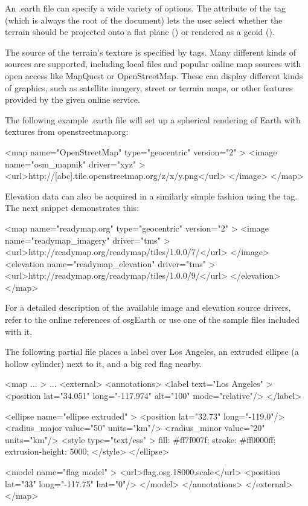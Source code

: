 An .earth file can specify a wide variety of options. The  attribute
of the  tag (which is always the root of the document) lets the user
select whether the terrain should be projected onto a flat plane
() or rendered as a geoid ().

The source of the terrain's texture is specified by  tags. Many
different kinds of sources are supported, including local files and popular
online map sources with open access like MapQuest or OpenStreetMap. These can
display different kinds of graphics, such as satellite imagery, street or
terrain maps, or other features provided by the given online service.

The following example .earth file will set up a spherical rendering of Earth
with textures from openstreetmap.org:

\begin{xml}
<map name="OpenStreetMap" type="geocentric" version="2" >
    <image name="osm_mapnik" driver="xyz" >
        <url>http://[abc].tile.openstreetmap.org/{z}/{x}/{y}.png</url>
    </image>
</map>
\end{xml}

Elevation data can also be acquired in a similarly simple fashion using the
 tag. The next snippet demonstrates this:

\begin{xml}
<map name="readymap.org" type="geocentric" version="2" >
    <image name="readymap_imagery" driver="tms" >
        <url>http://readymap.org/readymap/tiles/1.0.0/7/</url>
    </image>
    <elevation name="readymap_elevation" driver="tms" >
        <url>http://readymap.org/readymap/tiles/1.0.0/9/</url>
    </elevation>
</map>
\end{xml}

For a detailed description of the available image and elevation source drivers,
refer to the online references of osgEarth or use one of the sample  files
included with it.

The following partial  file places a label over Los Angeles, an extruded
ellipse (a hollow cylinder) next to it, and a big red flag nearby.

\begin{xml}
<map ... >
    ...
    <external>
        <annotations>
            <label text="Los Angeles" >
                <position lat="34.051" long="-117.974" alt="100" mode="relative"/>
            </label>

            <ellipse name="ellipse extruded" >
                <position lat="32.73" long="-119.0"/>
                <radius_major value="50" units="km"/>
                <radius_minor value="20" units="km"/>
                <style type="text/css" >
                    fill:             #ff7f007f;
                    stroke:           #ff0000ff;
                    extrusion-height: 5000;
                </style>
            </ellipse>

            <model name="flag model" >
                <url>flag.osg.18000.scale</url>
                <position lat="33" long="-117.75" hat="0"/>
            </model>
        </annotations>
    </external>
</map>
\end{xml}


